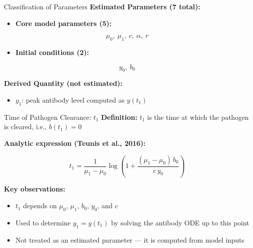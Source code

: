 \documentclass[
  ignorenonframetext,
]{beamer}
\providecommand{\tightlist}{%
  \setlength{\itemsep}{0pt}\setlength{\parskip}{0pt}}\usepackage{longtable,booktabs,array}
\begin{document}
\begin{frame}{Classification of Parameters}
\label{classification-of-parameters}
\textbf{Estimated Parameters (7 total):}

\begin{itemize}
\tightlist
\item
  \textbf{Core model parameters (5):}
\end{itemize}

\[
\mu_0,\ \mu_1,\ c,\ \alpha,\ r
\]

\begin{itemize}
\tightlist
\item
  \textbf{Initial conditions (2):}
\end{itemize}

\[
y_0,\ b_0
\]

\textbf{Derived Quantity (not estimated):}

\begin{itemize}
\tightlist
\item
  \(y_1\): peak antibody level computed as \(y(t_1)\)
\end{itemize}
\end{frame}

\begin{frame}{Time of Pathogen Clearance: \(t_1\)}
\label{time-of-pathogen-clearance-t_1}
\textbf{Definition:} \(t_1\) is the time at which the pathogen is
cleared, i.e., \(b(t_1) = 0\)

\textbf{Analytic expression (Teunis et al., 2016):}

\[
t_1 = \frac{1}{\mu_1 - \mu_0} \log\left(1 + \frac{(\mu_1 - \mu_0)\,b_0}{c\,y_0} \right)
\]

\textbf{Key observations:}

\begin{itemize}
\tightlist
\item
  \(t_1\) depends on \(\mu_0\), \(\mu_1\), \(b_0\), \(y_0\), and \(c\)
\item
  Used to determine \(y_1 = y(t_1)\) by solving the antibody ODE up to
  this point
\item
  Not treated as an estimated parameter --- it is computed from model
  inputs
\end{itemize}
\end{frame}
\end{document}
